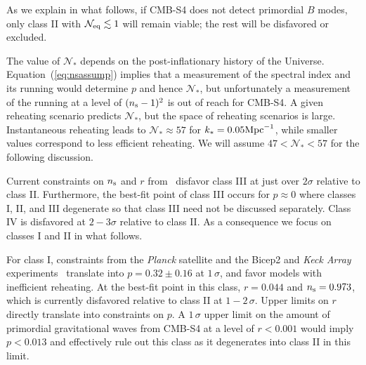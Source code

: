 As we explain in what follows, if CMB-S4 does not detect primordial $B$ modes, only class II with $\mathcal{N}_{\rm eq}\lesssim 1$ will remain viable; the rest will be disfavored or excluded.

The value of $\mathcal{N}_\ast$ depends on the post-inflationary history of the Universe. Equation~(\ref{eq:nsassump}) implies that a measurement of the spectral index and its running would determine $p$ and hence $\mathcal{N}_\ast$, but unfortunately a measurement of the running at a level of $(n_{\rm s}-1)^2$ is out of reach for CMB-S4. A given reheating scenario predicts $\mathcal{N}_\ast$, but the space of reheating scenarios is large. Instantaneous reheating leads to $\mathcal{N}_\ast\approx 57$ for $k_\ast=0.05 {\rm Mpc}^{-1}$, while smaller values correspond to less efficient reheating. We will assume $47<\mathcal{N}_\ast<57$ for the following discussion. 

Current constraints on $n_{\rm s}$ and $r$ from~\cite{Ade:2015tva} disfavor class III at just over $2\sigma$ relative to class II. Furthermore, the best-fit point of class III occurs for $p\approx 0$ where classes I, II, and III degenerate so that class III need not be discussed separately. Class IV is disfavored at $2-3\sigma$ relative to class II. As a consequence we focus on classes I and II in what follows.

For class I, constraints from the {\it Planck\/} satellite and the {\sc Bicep}2 and {\it Keck Array} experiments~\cite{Ade:2015tva} translate into $p=0.32\pm0.16$ at $1\,\sigma$, and favor models with inefficient reheating. At the best-fit point in this class, $r=0.044$ and $n_{\rm s}=0.973$, which is currently disfavored relative to class II at $1-2\,\sigma$. Upper limits on $r$ directly translate into constraints on $p$. A $1\,\sigma$ upper limit on the amount of primordial gravitational waves from CMB-S4 at a level of $r<0.001$ would imply $p<0.013$ and effectively rule out this class as it degenerates into class II in this limit. 

